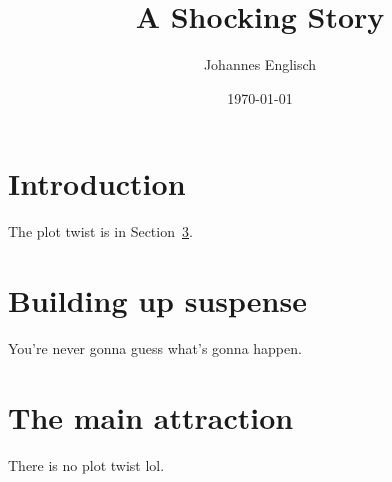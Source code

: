 \documentclass{scrartcl}
\title{A Shocking Story}
\author{Johannes Englisch}
\date{\today}
\begin{document}
\maketitle

\tableofcontents

\section{Introduction}

The plot twist is in Section~\ref{sec:main}.

\section{Building up suspense}

You're never gonna guess what's gonna happen.

\section{The main attraction}
\label{sec:main}

There is no plot twist lol.
\end{document}
